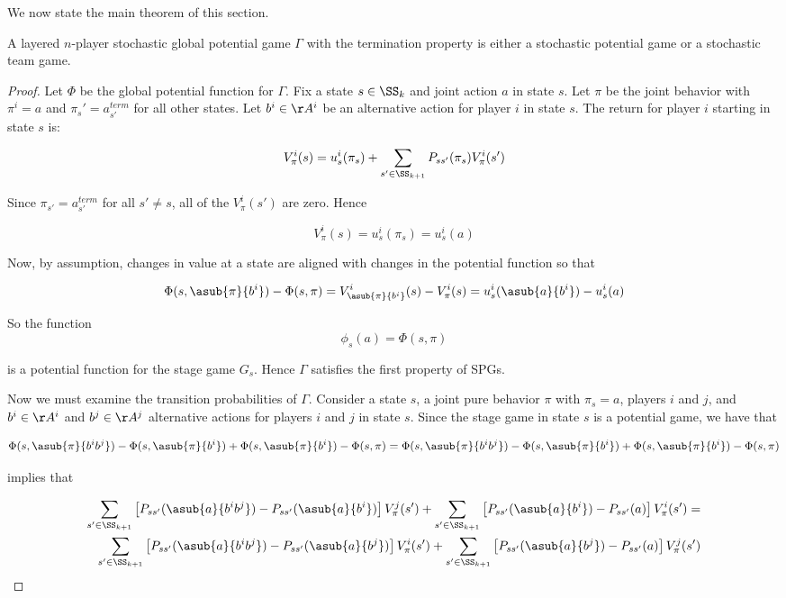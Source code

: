 We now state the main theorem of this section.

\begin{thm}
A layered $n$-player stochastic global potential game $\Gamma$ with the termination property is either a stochastic potential game or a stochastic team game.
\end{thm}

\begin{proof}
Let $\Phi$ be the global potential function for $\Gamma$. Fix a state $s \in \SS_k$ and joint action $a$ in state $s$. Let $\pi$ be the joint behavior with $\pi^i = a$ and $\pi_s' = a^{term}_{s'}$ for all other states. Let $b^i \in \AA^i$ be an alternative action for player $i$ in state $s$. The return for player $i$ starting in state $s$ is:

$$
V^i_{\pi}(s) = u^i_s(\pi_s) + \sum_{s' \in \SS_{k+1}} P_{ss'}(\pi_s) V^i_{\pi}(s')
$$

Since $\pi_{s'} = a^{term}_{s'}$ for all $s' \neq s$, all of the $V^i_{\pi}(s')$ are zero. Hence

$$
V^i_{\pi}(s) = u^i_s(\pi_s) = u^i_s(a)
$$

Now, by assumption, changes in value at a state are aligned with changes in the potential function so that

$$
\Phi(s,\asub{\pi}{b^i}) - \Phi(s,\pi) = V^i_{\asub{\pi}{b^i}}(s) - V^i_{\pi}(s) = u^i_s(\asub{a}{b^i}) - u^i_s(a)
$$

So the function
$$
\phi_s(a) = \Phi(s,\pi)
$$

is a potential function for the stage game $G_s$. Hence $\Gamma$ satisfies the first property of SPGs.

Now we must examine the transition probabilities of $\Gamma$. Consider a state $s$, a joint pure behavior $\pi$ with $\pi_s = a$, players $i$ and $j$, and $b^i \in \AA^i$ and $b^j \in \AA^j$ alternative actions for players $i$ and $j$ in state $s$. Since the stage game in state $s$ is a potential game, we have that

$$
\Phi(s,\asub{\pi}{b^ib^j}) - \Phi(s,\asub{\pi}{b^i}) + \Phi(s,\asub{\pi}{b^i}) - \Phi(s,\pi) \\
= \\
\Phi(s,\asub{\pi}{b^ib^j}) - \Phi(s,\asub{\pi}{b^i}) +\Phi(s,\asub{\pi}{b^i}) - \Phi(s,\pi)
$$

implies that

\begin{align*}
\sum_{s' \in \SS_{k+1}} \left[P_{ss'}(\asub{a}{b^ib^j}) - P_{ss'}(\asub{a}{b^i})\right] V^j_{\pi}(s') + \sum_{s' \in \SS_{k+1}} \left[P_{ss'}(\asub{a}{b^i}) - P_{ss'}(a)\right] V^i_{\pi}(s') = \\
\sum_{s' \in \SS_{k+1}} \left[P_{ss'}(\asub{a}{b^ib^j}) - P_{ss'}(\asub{a}{b^j})\right] V^i_{\pi}(s') + \sum_{s' \in \SS_{k+1}} \left[P_{ss'}(\asub{a}{b^j}) - P_{ss'}(a)\right] V^j_{\pi}(s')
\end{align*}


\end{proof}
